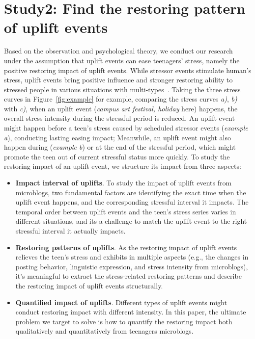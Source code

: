 \section{Study2: Find the restoring pattern of uplift events} 
Based on the observation and psychological theory,
we conduct our research under the assumption that uplift events can ease teenagers' stress,
namely the positive restoring impact of uplift events.
While stressor events stimulate human's stress,
uplift events bring positive influence and stronger restoring ability to stressed people in various situations with multi-types~\cite{Cohen1984Positive}\cite{Cohen2010Positive}\cite{Needles1990Positive}.
Taking the three stress curves in Figure~\ref{fig:example} for example,
comparing the stress curves \emph{a)}, \emph{b)} with \emph{c)},
when an uplift event (\emph{campus art festival, holiday} here) happens,
the overall stress intensity during the stressful period is reduced.
An uplift event might happen before a teen's stress caused by scheduled stressor events (\emph{example a}),
conducting lasting easing impact;
Meanwhile, an uplift event might also happen during (\emph{example b}) or at the end of the stressful period,
which might promote the teen out of current stressful status more quickly.
To study the restoring impact of an uplift event, we structure its impact from three aspects:
\begin{itemize}
\item \textbf{Impact interval of uplifts}.
To study the impact of uplift events from microblogs,
two fundamental factors are identifying the exact time when the uplift event happens,
and the corresponding stressful interval it impacts.
The temporal order between uplift events and the teen's stress series varies in different situations,
and its a challenge to match the uplift event to the right stressful interval it actually impacts.
\item \textbf{Restoring patterns of uplifts}.
As the restoring impact of uplift events relieves the teen's stress and exhibits in multiple aspects
(e.g., the changes in posting behavior, linguistic expression, and stress intensity from microblogs),
it's meaningful to extract the stress-related restoring patterns and describe the restoring impact of uplift events structurally.
\item \textbf{Quantified impact of uplifts}.
Different types of uplift events might conduct restoring impact with different intensity.
In this paper, the ultimate problem we target to solve
is how to quantify the restoring impact both qualitatively and quantitatively from teenagers microblogs.
\end{itemize}

